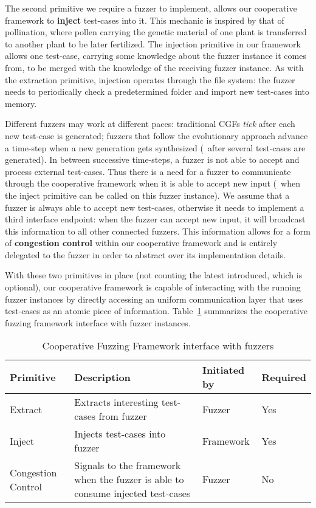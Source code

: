 The second primitive we require a fuzzer to implement, allows our cooperative
framework to \textbf{inject} test-cases into it. This mechanic is inspired by
that of pollination, where pollen carrying the genetic material of one plant is
transferred to another plant to be later fertilized. The injection primitive in
our framework allows one test-case, carrying some knowledge about the fuzzer
instance it comes from, to be merged with the knowledge of the receiving fuzzer
instance. As with the extraction primitive, injection operates through the file
system: the fuzzer needs to periodically check a predetermined folder and import
new test-cases into memory.

Different fuzzers may work at different paces: traditional \acp{CGF} \emph{tick}
after each new test-case is generated; fuzzers that follow the evolutionary
approach advance a time-step when a new generation gets synthesized (\eg~after
several test-cases are generated). In between successive time-steps, a fuzzer is
not able to accept and process external test-cases. Thus there is a need for a
fuzzer to communicate through the cooperative framework when it is able to
accept new input (\eg~when the inject primitive can be called on this fuzzer
instance). We assume that a fuzzer is always able to accept new test-cases,
otherwise it needs to implement a third interface endpoint: when the fuzzer can
accept new input, it will broadcast this information to all other connected
fuzzers. This information allows for a form of \textbf{congestion control}
within our cooperative framework and is entirely delegated to the fuzzer in
order to abstract over its implementation details.

With these two primitives in place (not counting the latest introduced, which is
optional), our cooperative framework is capable of interacting with the running
fuzzer instances by directly accessing an uniform communication layer that uses
test-cases as an atomic piece of information.
Table~\ref{tab:system-primitives} summarizes the cooperative fuzzing framework
interface with fuzzer instances.

\begin{table}[h]
    \centering
    \begin{tabularx}{\textwidth}{X >{\raggedright}p{} X p{}}
        \textbf{Primitive} & \textbf{Description} & \textbf{Initiated by} & \textbf{Required} \\
        \bottomrule
        Extract & Extracts interesting test-cases from fuzzer & Fuzzer & Yes \\
        Inject & Injects test-cases into fuzzer & Framework & Yes \\
        Congestion Control & Signals to the framework when the fuzzer is able to
            consume injected test-cases & Fuzzer & No
    \end{tabularx}
\caption{Cooperative Fuzzing Framework interface with fuzzers}
\label{tab:system-primitives}
\end{table}

